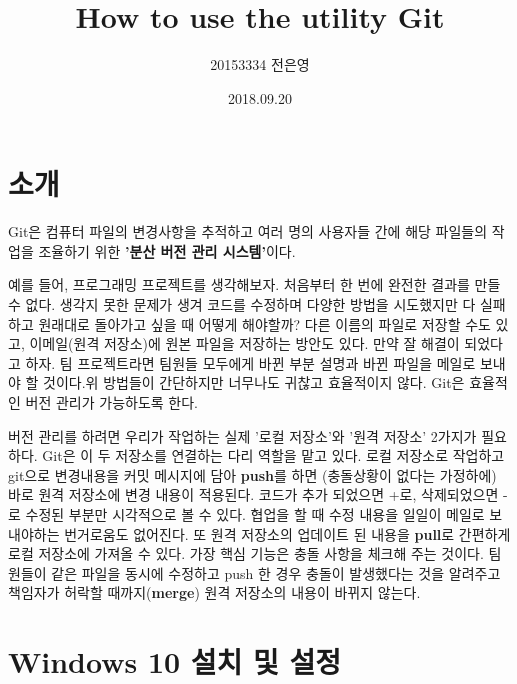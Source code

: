 \documentclass[a4paper]{article}
\title{How to use the utility Git}
\author{20153334 전은영}
\date{2018.09.20}
\begin{document}
	
	\maketitle
	
	\section{소개}
	
	Git은 컴퓨터 파일의 변경사항을 추적하고 여러 명의 사용자들 간에 해당 파일들의 작업을 조율하기 위한 \textbf{'분산 버전 관리 시스템'}이다.
	
	예를 들어, 프로그래밍 프로젝트를 생각해보자. 처음부터 한 번에 완전한 결과를 만들 수 없다. 생각지 못한 문제가 생겨 코드를 수정하며 다양한 방법을 시도했지만 다 실패하고 원래대로 돌아가고 싶을 때 어떻게 해야할까? 다른 이름의 파일로 저장할 수도 있고, 이메일(원격 저장소)에 원본 파일을 저장하는 방안도 있다. 만약 잘 해결이 되었다고 하자. 팀 프로젝트라면 팀원들 모두에게 바뀐 부분 설명과 바뀐 파일을 메일로 보내야 할 것이다.위 방법들이 간단하지만 너무나도 귀찮고 효율적이지 않다. Git은 효율적인 버전 관리가 가능하도록 한다.
	
	버전 관리를 하려면 우리가 작업하는 실제 '로컬 저장소'와 '원격 저장소' 2가지가 필요하다. Git은 이 두 저장소를 연결하는 다리 역할을 맡고 있다.
	로컬 저장소로 작업하고 git으로 변경내용을 커밋 메시지에 담아 \textbf{push}를 하면 (충돌상황이 없다는 가정하에) 바로 원격 저장소에 변경 내용이 적용된다. 코드가 추가 되었으면 +로, 삭제되었으면 -로 수정된 부분만 시각적으로 볼 수 있다. 협업을 할 때 수정 내용을 일일이 메일로 보내야하는 번거로움도 없어진다. 또 원격 저장소의 업데이트 된 내용을 \textbf{pull}로 간편하게 로컬 저장소에 가져올 수 있다. 
	가장 핵심 기능은 충돌 사항을 체크해 주는 것이다. 팀원들이 같은 파일을 동시에 수정하고 push 한 경우 충돌이 발생했다는 것을 알려주고 책임자가 허락할 때까지(\textbf{merge}) 원격 저장소의 내용이 바뀌지 않는다.
	
	
	
	\section{Windows 10 설치 및 설정}
	
\end{document}
